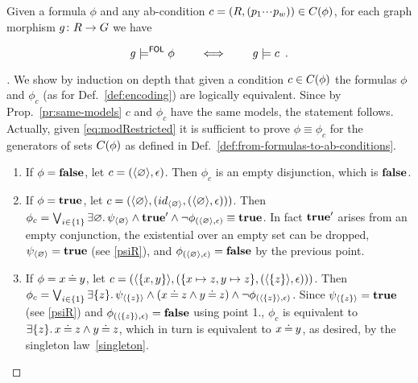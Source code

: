 \begin{proposition}
  \label{pr:same-models-2}
Given a formula $\phi$ and any ab-condition $c = (R, (p_1{\cdotp\mkern-2mu\cdotp\mkern-2mu\cdotp\mkern1mu} p_w)) \in C({\phi})$, for each graph morphism $g \colon R \rightarrow G$ we have

\[ g \models^{\mathsf{FOL}} \phi \qquad \iff \qquad g \models c \enspace.\] 

\end{proposition}
\begin{proof}[]
We show by induction on depth that given a condition $c \in C({\phi})$ the formulas $\phi$ and $\phi_{c}$ (as for Def.~\ref{def:encoding}) are logically equivalent. 
Since by Prop.~\ref{pr:same-models} $c$ and $\phi_{c}$ have the same models, the statement follows. Actually, given \eqref{eq:modRestricted} it is sufficient to prove $\phi \equiv \phi_{c}$ for the generators of sets $C({\phi})$ as defined in Def.~\ref{def:from-formulas-to-ab-conditions}.

\begin{enumerate}
  \item 
  If $\phi = \textbf{false}$, %
  let $c = (\langle \varnothing \rangle, \epsilon)$. Then $\phi_c$ is an empty disjunction, which is $\textbf{false}$.
  
  \item If $\phi = \textbf{true}$, let $c = (\langle \varnothing \rangle, (id_{\langle \varnothing \rangle},(\langle \varnothing \rangle,\epsilon)))$. Then $\phi_c = \bigvee_{i \in \{1\}}  \exists \varnothing.\, \psi_{\langle \varnothing \rangle} \land \textbf{true}' \land \neg \phi_{(\langle \varnothing \rangle,\epsilon)} \equiv \textbf{true}$. In fact  $\textbf{true}'$ arises from an empty conjunction,  the existential over an empty set can be dropped, $\psi_{\langle \varnothing \rangle} = \textbf{true}$ (see \eqref{psiR}), and $\phi_{(\langle \varnothing \rangle,\epsilon)} = \textbf{false}$ by the previous point.
  \item 
If $\phi = x \mathbin{\doteq} y$, let $c = (\langle \{x,y\} \rangle, (\{x\mapsto z,y \mapsto z\}, (\langle \{z\} \rangle,\epsilon)))$. Then $\phi_c = \bigvee_{i \in \{1\}}  \exists \{z\} .\,  \psi_{\langle \{z\} \rangle} \land (x \mathbin{\doteq} z \land y \mathbin{\doteq} z) \land \neg \phi_{(\langle \{z\} \rangle,\epsilon)}$. Since $ \psi_{\langle \{z\} \rangle} = \textbf{true}$ (see \eqref{psiR}) and $\phi_{(\langle \{z\} \rangle,\epsilon)} = \textbf{false}$ using point 1., $\phi_c$ is equivalent to $\exists \{z\} .\,  x \mathbin{\doteq} z \land y \mathbin{\doteq} z$, which in turn is equivalent to $x \mathbin{\doteq} y$, as desired, by the singleton law~\eqref{singleton}.


\end{enumerate}
\end{proof}
